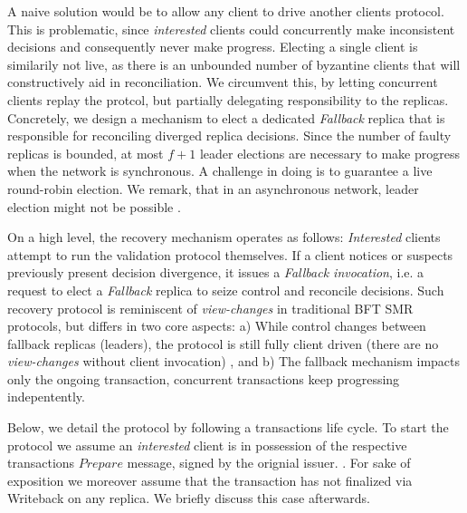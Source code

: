 A naive solution would be to allow any client to drive another clients protocol. This is problematic, since \textit{interested} clients could concurrently make inconsistent decisions and consequently never make progress. Electing a single client is similarily not live, as there is an unbounded number of byzantine clients that will constructively aid in reconciliation. We circumvent this, by letting concurrent clients replay the protcol, but partially delegating responsibility to the replicas. Concretely, we design a mechanism to elect  a dedicated \textit{Fallback} replica that is responsible for reconciling diverged replica decisions. Since the number of faulty replicas is bounded, at most $f+1$ leader elections are necessary to make progress when the network is synchronous. A challenge in doing is to guarantee a live round-robin election. We remark, that in an asynchronous network, leader election might not be possible . 

On a high level, the recovery mechanism operates as follows: \textit{Interested} clients attempt to run the validation protocol themselves. If a client notices or suspects previously present decision divergence, it issues a \textit{Fallback invocation}, i.e. a request to elect a \textit{Fallback} replica to seize control and reconcile decisions. Such recovery protocol is reminiscent of \textit{view-changes} in traditional BFT SMR protocols, but differs in two core aspects: a) While control changes between fallback replicas (leaders), the protocol is still fully client driven (there are no \textit{view-changes} without client invocation) , and b) The fallback mechanism impacts only the ongoing transaction, concurrent transactions keep progressing indepentently.

Below, we detail the protocol by following a transactions life cycle. To start the protocol we assume an \textit{interested} client is in possession of the respective transactions $Prepare$ message, signed by the orignial issuer. . For sake of exposition we moreover assume that the transaction has not finalized via Writeback on any replica. We briefly discuss this case afterwards.




